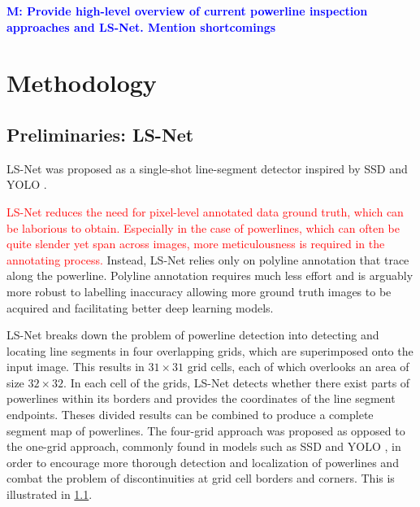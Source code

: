 \documentclass[journal]{IEEEtran}
\newcommand{\commentM}[1]{\textbf{\textcolor{blue}{M: #1}}}
\begin{document}
\commentM{Provide high-level overview of current powerline inspection approaches and LS-Net. Mention shortcomings}

\section{Methodology}

\subsection{Preliminaries: LS-Net}
LS-Net \cite{Nguyen2020} was proposed as a single-shot line-segment detector inspired by SSD \cite{SSD} and YOLO \cite{YOLO}. 

\textcolor{red}{LS-Net reduces the need for pixel-level annotated data ground truth, which can be laborious to obtain. Especially in the case of powerlines, which can often be quite slender yet span across images, more meticulousness is required in the annotating process.} Instead, LS-Net relies only on polyline annotation that trace along the powerline. Polyline annotation requires much less effort and is arguably more robust to labelling inaccuracy allowing more ground truth images to be acquired and facilitating better deep learning models. 

LS-Net breaks down the problem of powerline detection into detecting and locating line segments in four overlapping grids, which are superimposed onto the input image. This results in $31 \times 31$ grid cells, each of which overlooks an area of size $32 \times 32$. In each cell of the grids,  LS-Net detects whether there exist parts of powerlines within its borders and provides the coordinates of the line segment endpoints. Theses divided results can be combined to produce a complete segment map of powerlines. The four-grid approach was proposed as opposed to the one-grid approach, commonly found in models such as SSD \cite{SSD} and YOLO \cite{YOLO}, in order to encourage more thorough detection and localization of powerlines and combat the problem of discontinuities at grid cell borders and corners. This is illustrated in \ref{}. 
\end{document}

